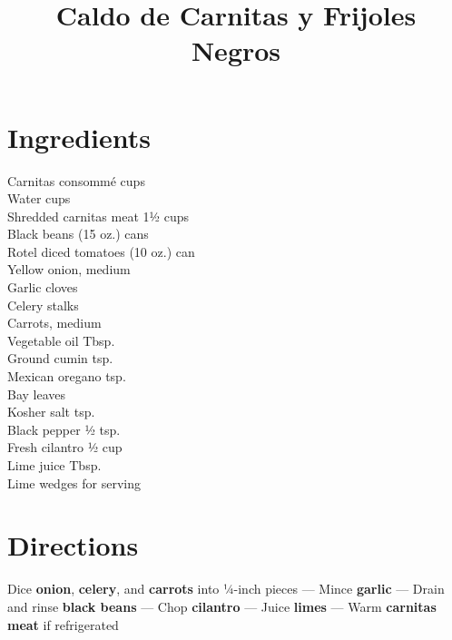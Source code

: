 \documentclass[11pt,letterpaper]{article}
\title{Caldo de Carnitas y Frijoles Negros}
\author{}
\date{}
\begin{document}
\maketitle
\thispagestyle{empty}

\section*{Ingredients}
\setlength{\columnsep}{20pt}
\begin{multicols}{2}
\noindent
    Carnitas consommé  cups \\
    Water  cups \\
    Shredded carnitas meat \dotfill 1½ cups \\
    Black beans  (15 oz.) cans \\
    Rotel diced tomatoes  (10 oz.) can \\
    Yellow onion, medium  \\
    Garlic cloves  \\
    Celery stalks  \\
    Carrots, medium  \\
    \columnbreak
    Vegetable oil  Tbsp. \\
    Ground cumin  tsp. \\
    Mexican oregano  tsp. \\
    Bay leaves  \\
    Kosher salt  tsp. \\
    Black pepper \dotfill ½ tsp. \\
    Fresh cilantro \dotfill ½ cup \\
    Lime juice  Tbsp. \\
    Lime wedges \dotfill for serving \\
\end{multicols}

\section*{Directions}

\noindent
Dice \textbf{onion}, \textbf{celery}, and \textbf{carrots} into ¼-inch pieces ---
Mince \textbf{garlic} ---
Drain and rinse \textbf{black beans} ---
Chop \textbf{cilantro} ---
Juice \textbf{limes} ---
Warm \textbf{carnitas meat} if refrigerated
\end{document}
